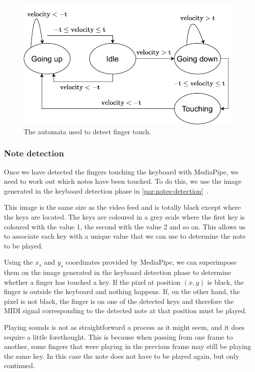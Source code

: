 \begin{figure}[ht]
	\centering
	\includegraphics[width=\textwidth]{images/application/touch-automata}
	\caption{The automata used to detect finger touch.}
	\label{fig:touch-automata}
\end{figure}

\subsubsection{Note detection}\label{subsubsec:notes-detection}
Once we have detected the fingers touching the keyboard with MediaPipe,
we need to work out which notes have been touched.
To do this, we use the image generated in the keyboard detection phase in
\autoref{par:notes-detection}~.

This image is the same size as the video feed and is totally black except where the keys are located.
The keys are coloured in a grey scale where the first key is coloured with the value 1,
the second with the value 2 and so on.
This allows us to associate each key with a unique value that we can use to determine the note to be played.

Using the $x_s$ and $y_s$ coordinates provided by MediaPipe, we can superimpose them on the image generated
in the keyboard detection phase to determine whether a finger has touched a key.
If the pixel at position $(x, y)$ is black, the finger is outside the keyboard and nothing happens.
If, on the other hand, the pixel is not black, the finger is on one of the detected keys and therefore the MIDI signal
corresponding to the detected note at that position must be played.

Playing sounds is not as straightforward a process as it might seem, and it does require a little forethought.
This is because when passing from one frame to another, some fingers that were playing
in the previous frame may still be playing the same key.
In this case the note does not have to be played again, but only continued.

